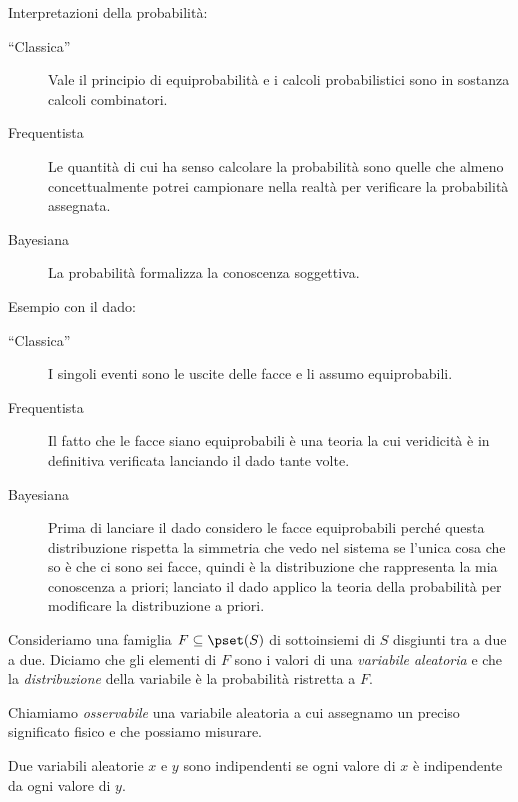 
Interpretazioni della probabilità:
\begin{description}
	\item[``Classica'']
		Vale il principio di equiprobabilità e i calcoli probabilistici sono in sostanza calcoli combinatori.
	\item[Frequentista]
		Le quantità di cui ha senso calcolare la probabilità sono quelle che almeno concettualmente potrei campionare nella realtà per verificare la probabilità assegnata.
	\item[Bayesiana]
		La probabilità formalizza la conoscenza soggettiva.
\end{description}
Esempio con il dado:
\begin{description}
	\item[``Classica'']
		I singoli eventi sono le uscite delle facce e li assumo equiprobabili.
	\item[Frequentista]
		Il fatto che le facce siano equiprobabili è una teoria la cui veridicità è in definitiva verificata lanciando il dado tante volte.
	\item[Bayesiana]
		Prima di lanciare il dado considero le facce equiprobabili perché questa distribuzione rispetta la simmetria che vedo nel sistema se l'unica cosa che so è che ci sono sei facce, quindi è la distribuzione che rappresenta la mia conoscenza a priori; lanciato il dado applico la teoria della probabilità per modificare la distribuzione a priori.
\end{description}

\begin{defn}
	Consideriamo una famiglia $F\subseteq\pset(S)$ di sottoinsiemi di $S$ disgiunti tra a due a due.
	Diciamo che gli elementi di $F$ sono i valori di una \emph{variabile aleatoria}
	e che la \emph{distribuzione} della variabile è la probabilità ristretta a $F$.
\end{defn}

\begin{defn}[Osservabile]
	Chiamiamo \emph{osservabile} una variabile aleatoria a cui assegnamo un preciso significato fisico e che possiamo misurare.
\end{defn}

\begin{defn}
	Due variabili aleatorie $x$ e $y$ sono indipendenti se ogni valore di $x$ è indipendente da ogni valore di $y$.
\end{defn}

